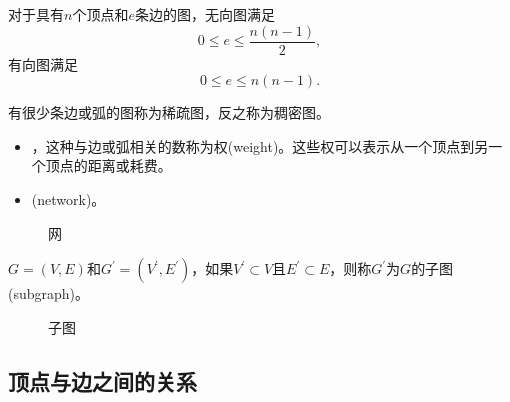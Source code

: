 \begin{frame}\ft{\subsubsecname}
对于具有$n$个顶点和$e$条边的图，无向图满足
$$
0\le e \le \frac{n(n-1)}2,
$$
有向图满足
$$
0\le e \le n(n-1).
$$
\end{frame}

\begin{frame}\ft{\subsubsecname}
\begin{dingyi}[稠密图与稀疏图]
有很少条边或弧的图称为稀疏图，反之称为稠密图。
\end{dingyi}\vspace{0.1in}

\end{frame}


\begin{frame}\ft{\subsubsecname}
\begin{dingyi}[网]
\begin{itemize}
\item
{}，这种与边或弧相关的数称为权(weight)。这些权可以表示从一个顶点到另一个顶点的距离或耗费。
\item
{}(network)。
\end{itemize}
\end{dingyi}

\begin{figure}
\centering

\caption{网}
\end{figure}

\end{frame}


\begin{frame}\ft{\subsubsecname}
\begin{dingyi}[子图]
$G=(V,E)$和$G^\prime=(V^\prime,E^\prime)$，如果$V^\prime\subset V$且$E^\prime\subset E$，则称$G^\prime$为$G$的子图(subgraph)。
\end{dingyi}
\end{frame}


\begin{frame}\ft{\subsubsecname}
\begin{figure}
\centering

\caption{子图}
\end{figure}

\end{frame}

\subsection{顶点与边之间的关系}

